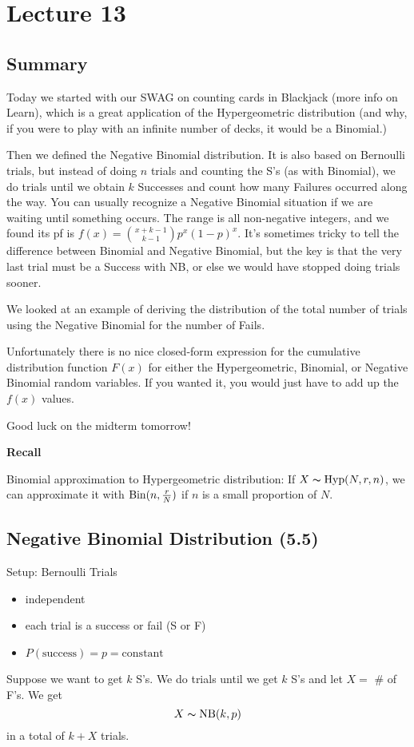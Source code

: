 \section{Lecture 13}
\subsection{Summary}

Today we started with our SWAG on counting cards in Blackjack (more info on Learn), which is a great application of the Hypergeometric distribution (and why, if you were to play with an infinite number of decks, it would be a Binomial.)

Then we defined the Negative Binomial distribution. It is also based on Bernoulli trials, but instead of doing $n$ trials and counting the S's (as with Binomial), we do trials until we obtain $k$ Successes and count how many Failures occurred along the way. You can usually recognize a Negative Binomial situation if we are waiting until something occurs. The range is all non-negative integers, and we found its pf is $f(x)=\binom{x+k-1}{k-1}p^x(1-p)^x$. It's sometimes tricky to tell the difference between Binomial and Negative Binomial, but the key is that the very last trial must be a Success with NB, or else we would have stopped doing trials sooner.

We looked at an example of deriving the distribution of the total number of trials using the Negative Binomial for the number of Fails.

Unfortunately there is no nice closed-form expression for the cumulative distribution function $F(x)$ for
either the Hypergeometric, Binomial, or Negative Binomial random variables. If you wanted it,
you would just have to add up the $f(x)$ values.

Good luck on the midterm tomorrow!

\textbf{Recall}

Binomial approximation to Hypergeometric distribution:
If $ X\thicksim\operatorname{Hyp} (N,r,n) $, we can approximate it with 
$ \operatorname{Bin} (n,\frac{r}{N}) $ if $ n $ is a small proportion of $ N $.

\subsection{Negative Binomial Distribution (5.5)}
Setup: Bernoulli Trials
\begin{itemize}
    \item independent
    \item each trial is a success or fail (S or F)
    \item $ P(\text{success})=p=\text{constant} $ 
\end{itemize}
Suppose we want to get $ k $ S's. We do trials until we get
$ k $ S's and let $ X= $ \# of F's. We get
\[ X\thicksim \operatorname{NB}(k,p) \]
in a total of $ k+X $ trials.


